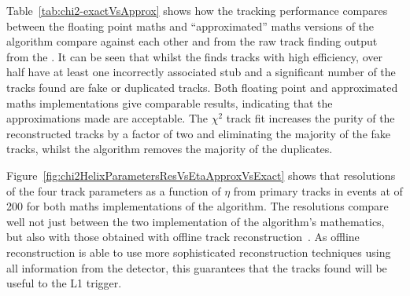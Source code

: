 Table~\ref{tab:chi2-exactVsApprox} shows how the tracking performance compares between the floating point maths and ``approximated'' maths versions of the algorithm compare against each other and from the raw track finding output from the \HT.
It can be seen that whilst the \HT finds tracks with high efficiency, over half have at least one incorrectly associated stub and a significant number of the tracks found are fake or duplicated tracks.
Both floating point and approximated maths implementations give comparable results, indicating that the approximations made are acceptable.
The $\chi^{2}$ track fit increases the purity of the reconstructed tracks by a factor of two and eliminating the majority of the fake tracks, whilst the \DR algorithm removes the majority of the duplicates.

Figure~\ref{fig:chi2HelixParametersResVsEtaApproxVsExact} shows that resolutions of the four track parameters as a function of $\eta$ from primary tracks in \ttbar events at \PU of 200 for both maths implementations of the algorithm.
The resolutions compare well not just between the two implementation of the algorithm's mathematics, but also with those obtained with offline track reconstruction~\cite{P2TrackerTDR}.
As offline reconstruction is able to use more sophisticated reconstruction techniques using all information from the detector, this guarantees that the tracks found will be useful to the L1 trigger.


